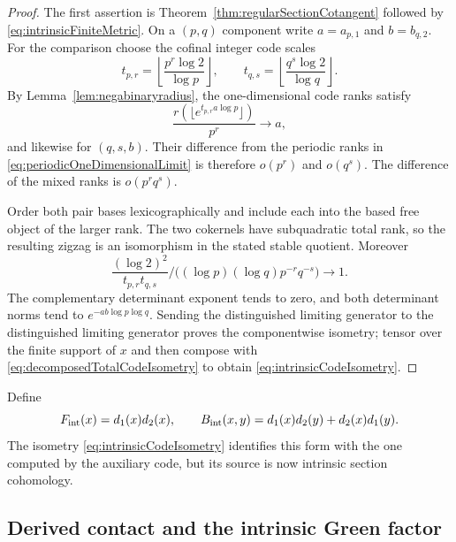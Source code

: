 \documentclass[11pt]{amsart}
\theoremstyle{definition}
\theoremstyle{remark}
\begin{document}
\begin{proof}
The first assertion is Theorem~\ref{thm:regularSectionCotangent} followed by
\eqref{eq:intrinsicFiniteMetric}.  On a $(p,q)$ component write
$a=a_{p,1}$ and $b=b_{q,2}$.  For the comparison choose the cofinal integer
code scales
\[
 t_{p,r}=\left\lfloor\frac{p^r\log2}{\log p}\right\rfloor,
 \qquad
 t_{q,s}=\left\lfloor\frac{q^s\log2}{\log q}\right\rfloor.
\]
By Lemma~\ref{lem:negabinaryradius}, the one-dimensional code ranks satisfy
\[
 \frac{r(\lfloor e^{t_{p,r}a\log p}\rfloor)}{p^r}\longrightarrow a,
\]
and likewise for $(q,s,b)$.  Their difference from the periodic ranks in
\eqref{eq:periodicOneDimensionalLimit} is therefore $o(p^r)$ and $o(q^s)$.
The difference of the mixed ranks is $o(p^rq^s)$.

Order both pair bases lexicographically and include each into the based
free object of the larger rank.  The two cokernels have subquadratic total
rank, so the resulting zigzag is an isomorphism in the stated stable
quotient.  Moreover
\[
 \frac{(\log2)^2}{t_{p,r}t_{q,s}}
 \big/\bigl((\log p)(\log q)p^{-r}q^{-s}\bigr)
 \longrightarrow1.
\]
The complementary determinant exponent tends to zero, and both determinant
norms tend to $e^{-ab\log p\log q}$.  Sending the distinguished limiting
generator to the distinguished limiting generator proves
the componentwise isometry; tensor over the finite support of $x$ and then
compose with \eqref{eq:decomposedTotalCodeIsometry} to obtain
\eqref{eq:intrinsicCodeIsometry}.
\end{proof}

Define
\begin{equation}\label{eq:intrinsicRRform}
 F_{\rm int}(x)=d_1(x)d_2(x),\qquad
 B_{\rm int}(x,y)=d_1(x)d_2(y)+d_2(x)d_1(y).
\end{equation}
The isometry \eqref{eq:intrinsicCodeIsometry} identifies this form with the
one computed by the auxiliary code, but its source is now intrinsic section
cohomology.



\subsection{Derived contact and the intrinsic Green factor}
\end{document}

